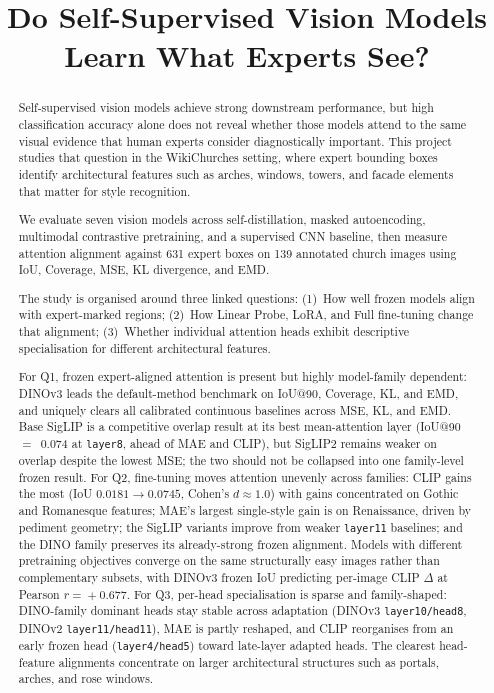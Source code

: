 \documentclass{article}
\title{Do Self-Supervised Vision Models Learn What Experts See?}
\begin{document}
\maketitle

\begin{abstract}
Self-supervised vision models achieve strong downstream performance, but high
classification accuracy alone does not reveal whether those models attend to the
same visual evidence that human experts consider diagnostically important. This
project studies that question in the WikiChurches setting, where expert bounding
boxes identify architectural features such as arches, windows, towers, and
facade elements that matter for style recognition.

We evaluate seven vision models across self-distillation, masked autoencoding,
multimodal contrastive pretraining, and a supervised CNN baseline, then measure
attention alignment against 631 expert boxes on 139 annotated church images
using IoU, Coverage, MSE, KL divergence, and EMD.

The study is organised around three linked questions:
(1)~How well frozen models align with expert-marked regions;
(2)~How Linear Probe, LoRA, and Full fine-tuning change that alignment;
(3)~Whether individual attention heads exhibit descriptive specialisation for
different architectural features.

For Q1, frozen expert-aligned attention is present but highly model-family
dependent: DINOv3 leads the default-method benchmark on IoU@90, Coverage, KL,
and EMD, and uniquely clears all calibrated continuous baselines across MSE,
KL, and EMD. Base SigLIP is a competitive overlap result at its best
mean-attention layer (IoU@90~$=$~0.074 at \texttt{layer8}, ahead of MAE and
CLIP), but SigLIP2 remains weaker on overlap despite the lowest MSE; the two
should not be collapsed into one family-level frozen result. For Q2,
fine-tuning moves attention unevenly across families: CLIP gains the most
(IoU $0.0181\!\to\!0.0745$, Cohen's $d\!\approx\!1.0$) with gains concentrated
on Gothic and Romanesque features; MAE's largest single-style gain is on
Renaissance, driven by pediment geometry; the SigLIP variants improve from
weaker \texttt{layer11} baselines; and the DINO family preserves its
already-strong frozen alignment. Models with
different pretraining objectives converge on the same structurally easy images
rather than complementary subsets, with DINOv3 frozen IoU predicting per-image
CLIP $\Delta$ at Pearson $r\!=\!+0.677$. For Q3, per-head specialisation is
sparse and family-shaped: DINO-family dominant heads stay stable across
adaptation (DINOv3 \texttt{layer10/head8}, DINOv2 \texttt{layer11/head11}), MAE
is partly reshaped, and CLIP reorganises from an early frozen head
(\texttt{layer4/head5}) toward late-layer adapted heads. The clearest
head-feature alignments concentrate on larger architectural structures such as
portals, arches, and rose windows.
\end{abstract}
\end{document}
